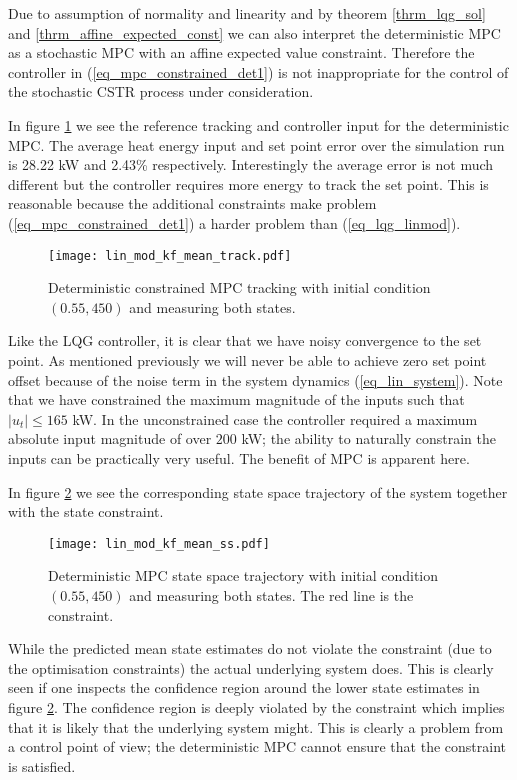 Due to assumption of normality and linearity and by theorem \ref{thrm_lqg_sol} and \ref{thrm_affine_expected_const} we can also interpret the deterministic MPC as a stochastic MPC with an affine expected value constraint. Therefore the controller in (\ref{eq_mpc_constrained_det1}) is not inappropriate for the control of the stochastic CSTR process under consideration.

In figure \ref{fig_lin_mod_kf_mean_track} we see the reference tracking and controller input for the deterministic MPC. The average heat energy input and set point error over the simulation run is 28.22 kW and 2.43\% respectively. Interestingly the average error is not much different but the controller requires more energy to track the set point. This is reasonable because the additional constraints make problem (\ref{eq_mpc_constrained_det1}) a harder problem than (\ref{eq_lqg_linmod}).
\begin{figure}[H] 
\centering
\texttt{[image: lin\_mod\_kf\_mean\_track.pdf]}
\caption{Deterministic constrained MPC tracking with initial condition $(0.55, 450)$ and measuring both states.}
\label{fig_lin_mod_kf_mean_track}
\end{figure}
Like the LQG controller, it is clear that we have noisy convergence to the set point. As mentioned previously we will never be able to achieve zero set point offset because of the noise term in the system dynamics (\ref{eq_lin_system}). Note that we have constrained the maximum magnitude of the inputs such that $|u_t| \leq 165$ kW. In the unconstrained case the controller required a maximum absolute input magnitude of over $200$ kW; the ability to naturally constrain the inputs can be practically very useful. The benefit of MPC is apparent here.

In figure \ref{fig_lin_mod_kf_mean_ss} we see the corresponding state space trajectory of the system together with the state constraint.
\begin{figure}[H]
\centering
\texttt{[image: lin\_mod\_kf\_mean\_ss.pdf]}
\caption{Deterministic MPC state space trajectory with initial condition $(0.55, 450)$ and measuring both states. The red line is the constraint.}
\label{fig_lin_mod_kf_mean_ss}
\end{figure}
While the predicted mean state estimates do not violate the constraint (due to the optimisation constraints) the actual underlying system does.  This is clearly seen if one inspects the confidence region around the lower state estimates in figure \ref{fig_lin_mod_kf_mean_ss}. The confidence region is deeply violated by the constraint which implies that it is likely that the underlying system might. This is clearly a problem from a control point of view; the deterministic MPC cannot ensure that the constraint is satisfied.

